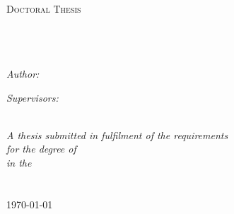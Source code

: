 \documentclass[11pt, oneside]{Thesis} %
\begin{document}
\begin{titlepage}
\begin{center}

\textsc{\LARGE \univname}\\[1.5cm] %
\textsc{\Large Doctoral Thesis}\\[0.5cm] %

\HRule \\[0.5cm] %
{\huge \bfseries \ttitle}\\[0.4cm] %
\HRule \\[1.5cm] %

\begin{minipage}{0.4\textwidth}
\begin{flushleft} \large
\emph{Author:}\\
{\authornames} %
\end{flushleft}
\end{minipage}
\begin{minipage}{0.4\textwidth}
\begin{flushright} \large
\emph{Supervisors:} \\
{\supname} %
\end{flushright}
\end{minipage}\\[3cm]
 
\large \textit{A thesis submitted in fulfilment of the requirements\\ for the degree of \degreename}\\[0.3cm] %
\textit{in the}\\[0.4cm]
\groupname\\\deptname\\[2cm] %
 
{\large \today}\\[4cm] %
 
\vfill
\end{center}

\end{titlepage}

\end{document}
